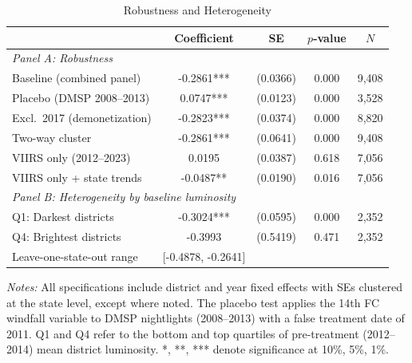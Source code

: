 \begin{table}[htbp]
\centering
\begin{threeparttable}
\caption{Robustness and Heterogeneity}
\label{tab:robustness}
\small
\begin{tabular}{lcccc}
\toprule
 & Coefficient & SE & $p$-value & $N$ \\
\midrule
\multicolumn{5}{l}{\textit{Panel A: Robustness}} \\[3pt]
Baseline (combined panel) & -0.2861*** & (0.0366) & 0.000 & 9,408 \\
Placebo (DMSP 2008--2013) & 0.0747*** & (0.0123) & 0.000 & 3,528 \\
Excl.\ 2017 (demonetization) & -0.2823*** & (0.0374) & 0.000 & 8,820 \\
Two-way cluster & -0.2861*** & (0.0641) & 0.000 & 9,408 \\
VIIRS only (2012--2023) & 0.0195 & (0.0387) & 0.618 & 7,056 \\
VIIRS only + state trends & -0.0487** & (0.0190) & 0.016 & 7,056 \\
\midrule
\multicolumn{5}{l}{\textit{Panel B: Heterogeneity by baseline luminosity}} \\[3pt]
Q1: Darkest districts & -0.3024*** & (0.0595) & 0.000 & 2,352 \\
Q4: Brightest districts & -0.3993 & (0.5419) & 0.471 & 2,352 \\
\midrule
Leave-one-state-out range & [-0.4878, -0.2641] & & & \\
\bottomrule
\end{tabular}
\begin{tablenotes}[flushleft]\footnotesize
\item \textit{Notes:} All specifications include district and year fixed effects with SEs clustered at the state level, except where noted. The placebo test applies the 14th FC windfall variable to DMSP nightlights (2008--2013) with a false treatment date of 2011. Q1 and Q4 refer to the bottom and top quartiles of pre-treatment (2012--2014) mean district luminosity. *, **, *** denote significance at 10\%, 5\%, 1\%.
\end{tablenotes}
\end{threeparttable}
\end{table}
